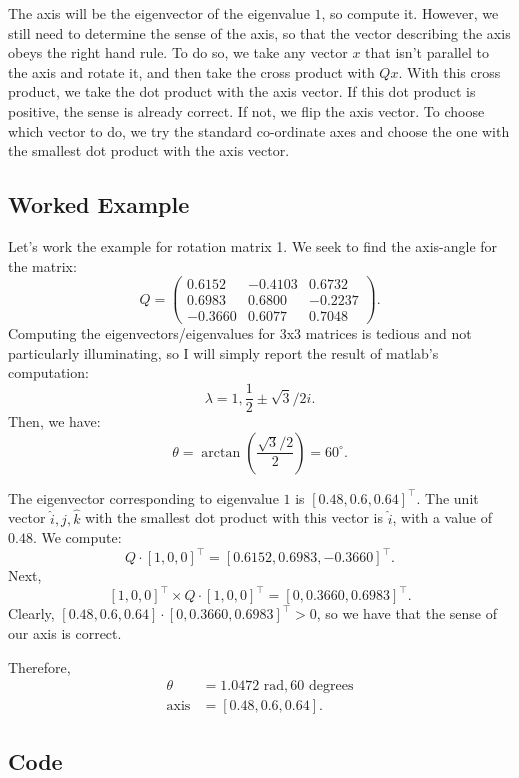 \documentclass[11pt]{article}
\begin{document}
The axis will be the eigenvector of the eigenvalue $1$, so compute it.
However, we still need to determine the sense of the axis, so that the vector describing the axis obeys the right hand rule.
To do so, we take any vector $x$ that isn't parallel to the axis and rotate it, and then take the cross product with $Q x$.
With this cross product, we take the dot product with the axis vector.
If this dot product is positive, the sense is already correct.
If not, we flip the axis vector.
To choose which vector to do, we try the standard co-ordinate axes and choose the one with the smallest dot product with the axis vector.

\subsection*{Worked Example}

Let's work the example for rotation matrix 1.
We seek to find the axis-angle for the matrix:
\[
    Q = \begin{pmatrix} 0.6152 & -0.4103 & 0.6732\\ 0.6983 & 0.6800 & -0.2237\\ -0.3660 & 0.6077 & 0.7048 \end{pmatrix} 
.\] 
Computing the eigenvectors/eigenvalues for 3x3 matrices is tedious and not particularly illuminating, so I will simply report the result of matlab's computation:
\[
\lambda = 1, \frac{1}{2} \pm \sqrt{3}/2 i
.\] 
Then, we have:
\[
\theta = \arctan\left(\frac{\sqrt{3} / 2}{2}\right) = 60^{\circ}
.\] 

The eigenvector corresponding to eigenvalue $1$ is $[0.48, 0.6, 0.64]^{\top}$.
The unit vector $\hat{i}, \hat{j}, \hat{k}$ with the smallest dot product with this vector is $\hat{i}$, with a value of $0.48$.
We compute:
\[
Q\cdot [1, 0, 0]^{\top} = [0.6152, 0.6983, -0.3660]^{\top}
.\] 
Next,
\[
[1, 0, 0]^{\top} \times Q \cdot [1, 0, 0]^{\top} = [0, 0.3660, 0.6983]^{\top}
.\] 
Clearly, $[0.48, 0.6, 0.64] \cdot [0, 0.3660, 0.6983]^{\top} > 0
$, so we have that the sense of our axis is correct.

Therefore,
\begin{align*}
    \theta &= 1.0472 \text{ rad}, 60 \text{ degrees}\\
    \text{axis} &= [0.48, 0.6, 0.64]
.\end{align*}

\subsection*{Code}
\end{document}
